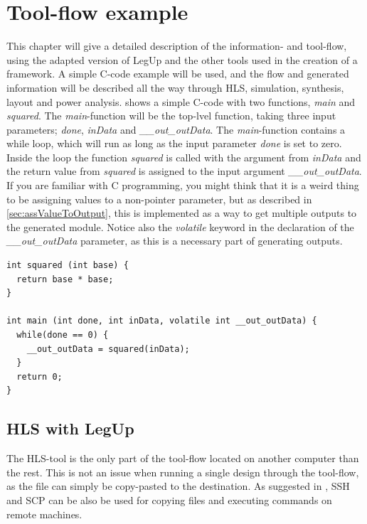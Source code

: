\chapter{\label{chp:toolflowex}Tool-flow example}
This chapter will give a detailed description of the information- and tool-flow, using the adapted version of LegUp and the other tools used in the creation of a framework. A simple C-code example will be used, and the flow and generated information will be described all the way through HLS, simulation, synthesis, layout and power analysis.  shows a simple C-code with two functions, \textit{main} and \textit{squared}. The \textit{main}-function will be the top-lvel function, taking three input parameters; \textit{done}, \textit{inData} and \textit{\_\_out\_outData}. The \textit{main}-function contains a while loop, which will run as long as the input parameter \textit{done} is set to zero. Inside the loop the function \textit{squared} is called with the argument from \textit{inData} and the return value from \textit{squared} is assigned to the input argument \textit{\_\_out\_outData}. If you are familiar with C programming, you might think that it is a weird thing to be assigning values to a non-pointer parameter, but as described in \cref{sec:assValueToOutput}, this is implemented as a way to get multiple outputs to the generated module. Notice also the \textit{volatile} keyword in the declaration of the \textit{\_\_out\_outData} parameter, as this is a necessary part of generating outputs.
\lstset{language=C++,style=Cstyle}
\begin{lstlisting}[caption={Simple C-code example},label=lst:ccodelisting]
int squared (int base) {
  return base * base;
}

int main (int done, int inData, volatile int __out_outData) {
  while(done == 0) {
    __out_outData = squared(inData);
  }
  return 0;
}
\end{lstlisting}

\section{HLS with LegUp}
The HLS-tool is the only part of the tool-flow located on another computer than the rest. This is not an issue when running a single design through the tool-flow, as the file can simply be copy-pasted to the destination. As suggested in \cite{holm2015pro}, SSH and SCP can be also be used for copying files and executing commands on remote machines.
